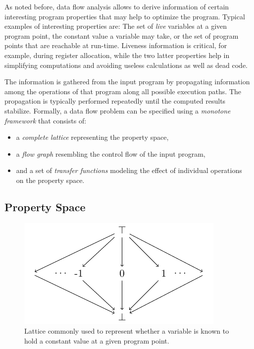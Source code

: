 As noted before, data flow analysis allows to derive information of certain
interesting program properties that may help to optimize the program. Typical
examples of interesting properties are: The set of \emph{live} variables at a
given program point, the constant value a variable may take, or the set of
program points that are reachable at run-time. Liveness information is critical,
for example, during register allocation, while the two latter properties help
in simplifying computations and avoiding useless calculations as well as dead
code.

The information is gathered from the input program by propagating information
among the operations of that program along all possible execution paths. The
propagation is typically performed repeatedly until the computed results
stabilize. Formally, a data flow problem can be specified using a \emph{monotone
framework} that consists of:
\begin{itemize}
  \item a \emph{complete lattice} representing the property space,
  \item a \emph{flow graph} resembling the control flow of the input program,
  \item and a set of \emph{transfer functions} modeling the effect of individual
        operations \\ on the property space.
\end{itemize}

\subsection{Property Space}
\label{novillo:sec:property_space}

\begin{figure}[b]
  \begin{center}
    \includegraphics{constprop_lattice}
  \end{center}
  \vspace{-1em}
  \caption{Lattice commonly used to represent whether a variable is known to
           hold a constant value at a given program point.}
  \label{novillo:fig:lattice_constant_propagation}
\end{figure}


